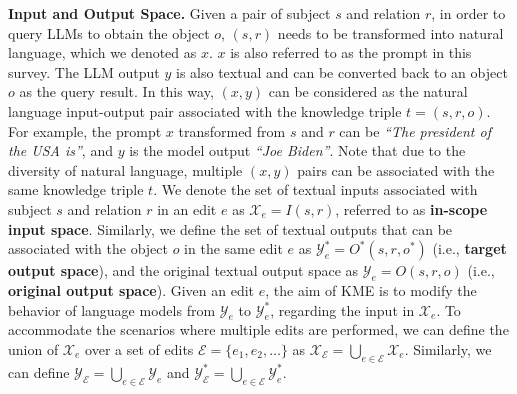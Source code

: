 \documentclass[acmsmall, screen]{acmart}
\begin{document}
\vspace{0.05in}
\noindent\textsf{\textbf{Input and Output Space.}}
Given a pair of subject $s$ and relation $r$, in order to query LLMs to obtain the object $o$, $(s,r)$ needs to be transformed into natural language,
which we denoted as $x$. $x$ is also referred to as the prompt in this survey. The LLM output $y$ is also textual and can be converted back to an object $o$ as the query result. In this way, $(x,y)$ can be considered as the natural language input-output pair associated with the knowledge triple $t=(s,r,o)$. For example, the prompt $x$ transformed from $s$ and $r$ can be \textit{``The president
of the USA is''}, and $y$ is the model output \textit{``Joe Biden''}. Note that due to the diversity of natural language, multiple $(x,y)$ pairs can be associated with the same knowledge triple $t$. We denote the set of textual inputs associated with subject $s$ and relation $r$ in an edit $e$ as $\mathcal{X}_e=I(s,r)$, referred to as \textbf{in-scope input space}. Similarly, we define the set of textual outputs that can be associated with the object $o$ in the same edit $e$ as $\mathcal{Y}_e^*=O^*(s,r,o^*)$ (i.e., \textbf{target output space}), and the original textual output space as $\mathcal{Y}_e=O(s,r,o)$ (i.e., \textbf{original output space}). Given an edit $e$, the aim of KME is to modify the behavior of language models from $\mathcal{Y}_e$ to $\mathcal{Y}_e^*$, regarding the input in $\mathcal{X}_e$. To accommodate the scenarios where multiple edits are performed, we can define the union of $\mathcal{X}_e$ over a set of edits $\mathcal{E}=\{e_1,e_2,\dotsc\}$ as $\mathcal{X}_{\mathcal{E}}=\bigcup_{e\in\mathcal{E}}\mathcal{X}_e$. Similarly, we can define $\mathcal{Y}_{\mathcal{E}}=\bigcup_{e\in\mathcal{E}}\mathcal{Y}_e$ and $\mathcal{Y}^*_{\mathcal{E}}=\bigcup_{e\in\mathcal{E}}\mathcal{Y}^*_e$.


\end{document}
